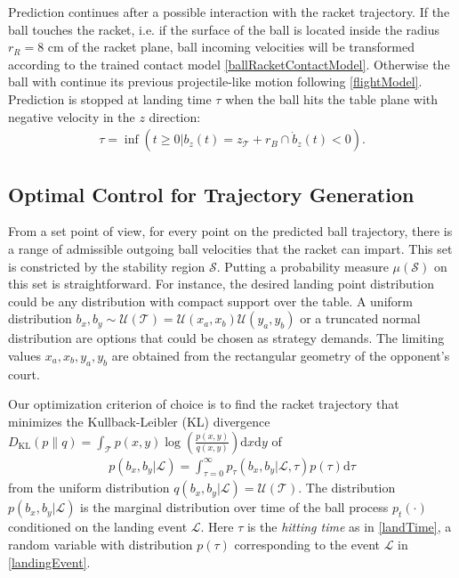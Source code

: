 \documentclass[letterpaper, 10 pt, conference]{ieeeconf}
\newcommand{\ballRadius}{r_B}
\newcommand{\racketRadius}{r_R} %
\newcommand{\stabilityRegion}{\mathcal{S}} %
\newcommand{\court}{\mathcal{T}} %
\newcommand{\landTime}{\tau} %
\newcommand{\landEvent}{\mathcal{L}} %
\newcommand{\landDist}{p(\tau)} %
\newcommand{\KL}{D_{\mathrm{KL}}}
\begin{document}
Prediction continues after a possible interaction with the racket trajectory. If the ball touches the racket, i.e. if the surface of the ball is located inside the radius $\racketRadius = 8$ cm of the racket plane, ball incoming velocities will be transformed according to the trained contact model \eqref{ballRacketContactModel}. Otherwise the ball with continue its previous projectile-like motion following \eqref{flightModel}. Prediction is stopped at landing time $\landTime$ when the ball hits the table plane with negative velocity in the $z$ direction: 
%
\begin{align}
\landTime = \inf(t \geq 0 | b_z(t) = z_{\court} + \ballRadius \cap \dot{b}_z(t) < 0).
\label{landTime}
\end{align}
%
\subsection{Optimal Control for Trajectory Generation}

From a set point of view, for every point on the predicted ball trajectory, there is a range of admissible outgoing ball velocities that the racket can impart. This set is constricted by the stability region $\stabilityRegion$. 
Putting a probability measure $\mu(\stabilityRegion)$ on this set is straightforward. For instance, the desired landing point distribution could be any distribution with compact support over the table. A uniform distribution $b_x, b_y \sim \mathcal{U}(\court) = \mathcal{U}(x_{a},x_{b})\mathcal{U}(y_{a},y_{b})$ or a truncated normal distribution are options that could be chosen as strategy demands. The limiting values $x_{a},x_{b},y_{a},y_{b}$ are obtained from the rectangular geometry of the opponent's court.
%

Our optimization criterion of choice is to find the racket trajectory that minimizes the Kullback-Leibler (KL) divergence $\KL(p\|q) = \int_{\court}p(x,y)\log(\frac{p(x,y)}{q(x,y)})\textrm{d}x\textrm{d}y$ of 
%
\begin{align}
p(b_x,b_y|\landEvent) = \int_{\landTime = 0}^{\infty} p_{\landTime}(b_x,b_y|\landEvent,\landTime)\landDist \textrm{d}\landTime
\label{marginalProcess}
\end{align}
%
from the uniform distribution $q(b_x,b_y|\landEvent) = \mathcal{U}(\court)$. The distribution $p(b_x,b_y|\landEvent)$ is the marginal distribution over time of the ball process $p_t(\cdot)$ conditioned on the landing event $\landEvent$. Here $\landTime$ is the \emph{hitting time} as in \eqref{landTime}, a random variable with distribution $p(\landTime)$ corresponding to the event $\landEvent$ in \eqref{landingEvent}.
\end{document}
